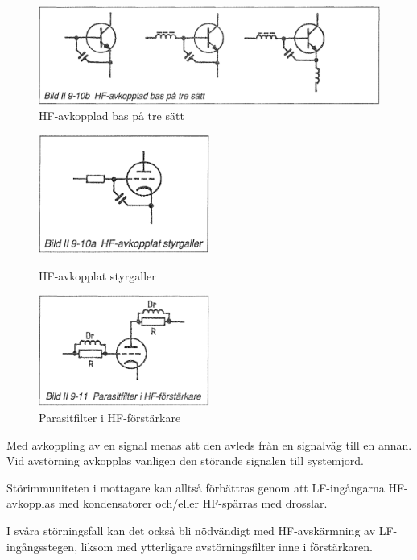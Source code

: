\begin{figure}
  \includegraphics[width=\textwidth]{images/bild_2_9-10b}
  \caption{HF-avkopplad bas på tre sätt}
  \label{fig:bildII9-10b}
\end{figure}

\begin{figure}
  \includegraphics[width=0.5\textwidth]{images/bild_2_9-10a}
  \caption{HF-avkopplat styrgaller}
  \label{fig:bildII9-10a}

  \includegraphics[width=0.5\textwidth]{images/bild_2_9-11}
  \caption{Parasitfilter i HF-förstärkare}
  \label{fig:bildII9-11}
\end{figure}

Med avkoppling av en signal menas att den avleds från en signalväg
till en annan. Vid avstörning avkopplas vanligen den störande
signalen till systemjord.

Störimmuniteten i mottagare kan alltså förbättras genom att LF-ingångarna
HF-avkopplas med kondensatorer och/eller HF-spärras med drosslar.

I svåra störningsfall kan det också bli nödvändigt med HF-avskärmning
av LF-ingångsstegen, liksom med ytterligare avstörningsfilter inne i
förstärkaren.

